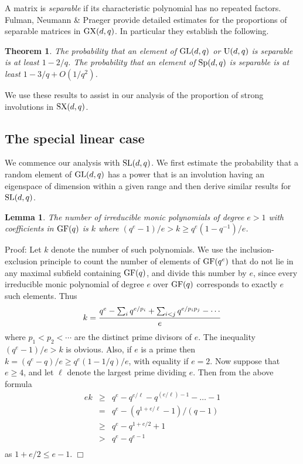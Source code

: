 \documentclass[12pt]{article}
\newtheorem{lemma}[definition]{Lemma}
\newtheorem{theorem}[definition]{Theorem}
\newenvironment{proof}{\normalsize {\sc Proof}:}{{\hfill $\Box$ \\}}
\def\SL{{\rm SL}}
\def\GL{{\rm GL}}
\def\U{{\rm U}}
\def\GF{{\rm GF}}
\def\Sp{{\rm Sp}}
\def\SX{{\rm SX}}
\def\GX{{\rm GX}}
\begin{document}
A matrix is {\it separable} if its characteristic polynomial
has no repeated factors.
Fulman, Neumann \& Praeger \cite{FNP} 
provide detailed estimates for the proportions
of separable matrices in $\GX(d, q)$.
In particular they establish the following. 
\begin{theorem}\label{Lemma5.1}  
The probability that an 
element of $\GL(d,q)$ or $\U(d,q)$ is separable is 
at least $1-2/q$.
The probability that an 
element of $\Sp(d,q)$ is separable is 
at least $1-3/q + O(1/q^2)$.
\end{theorem}

We use these results to assist in our analysis of the 
proportion of strong involutions in $\SX(d, q)$.

\subsection{The special linear case}\label{sl}
We commence our analysis with $\SL(d, q)$.
We first estimate the probability that a random element of
$\GL(d,q)$ has a power that is an involution having an eigenspace
of dimension within a given range and then derive 
similar results for $\SL(d, q)$.


\begin{lemma}\label{monic} 
The number of irreducible monic polynomials of degree
$e>1$ with coefficients in $\GF(q)$ is $k$ where
$(q^e-1)/e>k\ge q^e(1-q^{-1})/e$.
\end{lemma}
\begin{proof}
Let $k$ denote the number of such polynomials.
We use the inclusion-exclusion principle to count the
number of elements of $\GF(q^e)$ that do not lie in any  maximal
subfield containing $\GF(q)$, and divide this number by $e$, since
every irreducible monic polynomial of degree $e$ over $\GF(q)$ corresponds
to exactly $e$ such elements.  Thus 
$$k = {q^e-\sum_iq^{e/p_i}+\sum_{i<j}q^{e/p_ip_j}-\cdots\over e}$$ 
where $p_1<p_2<\cdots$ are the distinct prime divisors of $e$. 
The inequality $(q^e-1)/e >k$ is obvious.  Also, if $e$ is a prime
then $k=(q^e-q)/e\ge q^e(1-1/q)/e$, with equality if $e=2$.
Now suppose that $e\ge4$, and let $\ell$ denote the largest prime
dividing $e$.  Then from the above formula 
\begin{eqnarray*}
ek & \ge & q^e-q^{e/\ell}-q^{(e/\ell)-1}-\ldots -1 \\
   & = &  q^e - (q^{1+e/\ell}-1)/(q-1)\\
   & \ge & q^e - q^{1+e/2}+1 \\
   & > & q^e - q^{e-1} \\
\end{eqnarray*}
as $1+e/2\le e-1$.
\end{proof}
\end{document}
